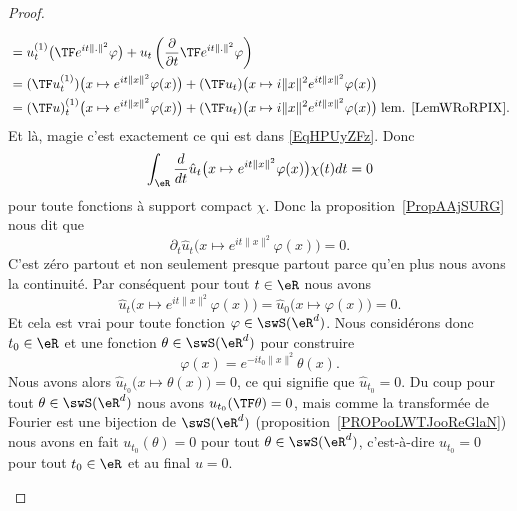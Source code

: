 \begin{proof}
\begin{subproof}
\begin{subequations}
\begin{align}
				                                                              & =u_t^{(1)}\big( \TF  e^{it\| . \|^2}\varphi \big)+u_t\left( \frac{ \partial  }{ \partial t }\TF e^{it\| . \|^2}\varphi \right)                                     \\
				                                                              & =(\TF u_t^{(1)})\big( x\mapsto  e^{it\| x \|^2}\varphi(x) \big)+(\TF u_t)\big( x\mapsto i\| x \|^2 e^{it\| x \|^2}\varphi(x) \big)                                 \\
				                                                              & =(\TF u)_t^{(1)}\big( x\mapsto  e^{it\| x \|^2}\varphi(x) \big)+(\TF u_t)\big( x\mapsto i\| x \|^2 e^{it\| x \|^2}\varphi(x) \big)\;	\text{lem. \ref{LemWRoRPIX}.}
			\end{align}
		\end{subequations}
		Et là, magie c'est exactement ce qui est dans \eqref{EqHPUyZFz}. Donc
		\begin{equation}
			\int_{\eR}\frac{ d }{ dt }\hat u_t\big( x\mapsto  e^{it\| x \|^2}\varphi(x) \big)\chi(t)dt=0
		\end{equation}
		pour toute fonctions à support compact \( \chi\). Donc la proposition~\ref{PropAAjSURG} nous dit que
		\begin{equation}
			\partial_t\hat u_t\big( x\mapsto e^{it\| x \|^2}\varphi(x) \big)=0.
		\end{equation}
		C'est zéro partout et non seulement presque partout parce qu'en plus nous avons la continuité. Par conséquent pour tout \( t\in \eR\) nous avons
		\begin{equation}
			\hat u_t\big( x\mapsto e^{it\| x \|^2}\varphi(x) \big)=\hat u_0\big( x\mapsto \varphi(x)\big)=0.
		\end{equation}
		Et cela est vrai pour toute fonction \( \varphi\in\swS(\eR^d)\). Nous considérons donc \( t_0\in \eR\) et une fonction \( \theta\in\swS(\eR^d)\) pour construire
		\begin{equation}
			\varphi(x)= e^{-it_0\| x \|^2}\theta(x).
		\end{equation}
		Nous avons alors \( \hat u_{t_0}\big( x\mapsto\theta(x) \big)=0\), ce qui signifie que \( \hat u_{t_0}=0\). Du coup pour tout \( \theta\in\swS(\eR^d)\) nous avons \( u_{t_0}(\TF\theta)=0\), mais comme la transformée de Fourier est une bijection de \( \swS(\eR^d)\) (proposition~\ref{PROPooLWTJooReGlaN}) nous avons en fait \( u_{t_0}(\theta)=0\) pour tout \( \theta\in\swS(\eR^d)\), c'est-à-dire \( u_{t_0}=0\) pour tout \( t_0\in \eR\) et au final \( u=0\).
	\end{subproof}
\end{proof}
